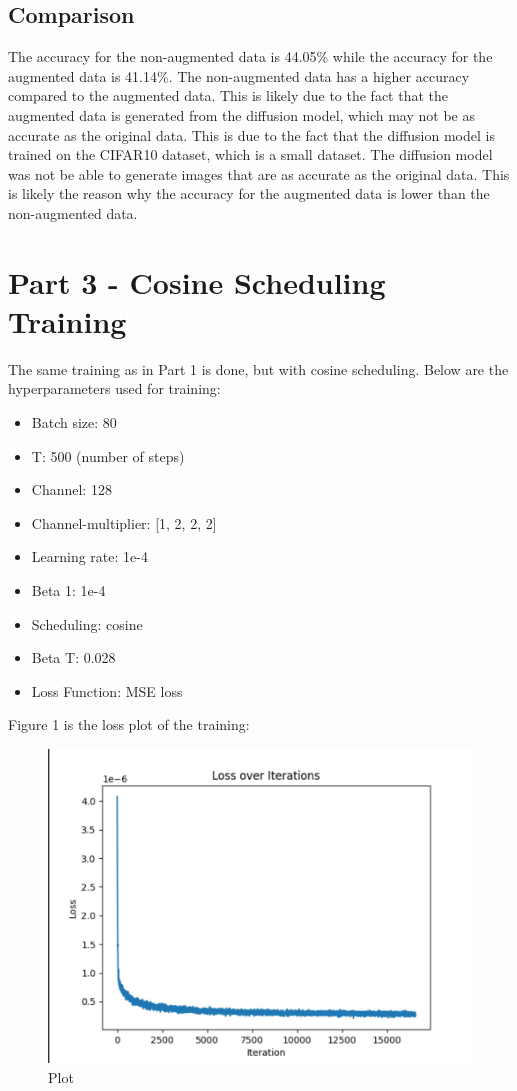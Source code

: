 \documentclass[conference]{IEEEtran}
\begin{document}
\subsection{Comparison}
The accuracy for the non-augmented data is 44.05\% while the accuracy for the augmented data is 41.14\%. The non-augmented data has a higher accuracy compared to the augmented data. This is likely due to the fact that the augmented data is generated from the diffusion model, which may not be as accurate as the original data.
This is due to the fact that the diffusion model is trained on the CIFAR10 dataset, which is a small dataset. 
The diffusion model was not be able to generate images that are as accurate as the original data. 
This is likely the reason why the accuracy for the augmented data is lower than the non-augmented data.


\section{Part 3 - Cosine Scheduling Training}
The same training as in Part 1 is done, but with cosine scheduling. Below are the hyperparameters used for training:
\begin{itemize}
  \item Batch size: 80
  \item T: 500 (number of steps)
  \item Channel: 128
  \item Channel-multiplier: [1, 2, 2, 2]
  \item Learning rate: 1e-4
  \item Beta 1: 1e-4
  \item Scheduling: cosine
  \item Beta T: 0.028
  \item Loss Function: MSE loss
\end{itemize}

Figure 1 is the loss plot of the training:
\begin{figure}[!h]
  \centering
  \includegraphics[scale=0.2]{./images/cosineloss.png}
  \caption{Plot}
\end{figure} 
\end{document}
